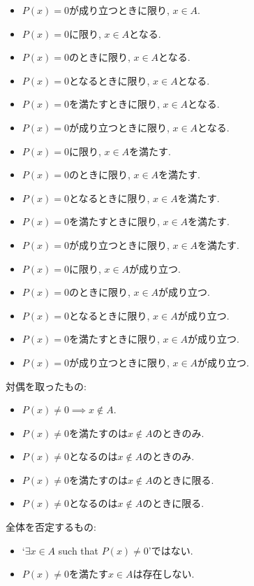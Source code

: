 \documentclass[a4paper,12pt,draft]{amsart}
\begin{document}
\begin{itemize}
\item $P(x)=0$が成り立つときに限り, $x\in A$.
\item $P(x)=0$に限り, $x\in A$となる.
\item $P(x)=0$のときに限り, $x\in A$となる.
\item $P(x)=0$となるときに限り, $x\in A$となる.
\item $P(x)=0$を満たすときに限り, $x\in A$となる.
\item $P(x)=0$が成り立つときに限り, $x\in A$となる.
\item $P(x)=0$に限り, $x\in A$を満たす.
\item $P(x)=0$のときに限り, $x\in A$を満たす.
\item $P(x)=0$となるときに限り, $x\in A$を満たす.
\item $P(x)=0$を満たすときに限り, $x\in A$を満たす.
\item $P(x)=0$が成り立つときに限り, $x\in A$を満たす.
\item $P(x)=0$に限り, $x\in A$が成り立つ.
\item $P(x)=0$のときに限り, $x\in A$が成り立つ.
\item $P(x)=0$となるときに限り, $x\in A$が成り立つ.
\item $P(x)=0$を満たすときに限り, $x\in A$が成り立つ.
\item $P(x)=0$が成り立つときに限り, $x\in A$が成り立つ.
\end{itemize}
対偶を取ったもの:
\begin{itemize}
\item $P(x)\neq 0\implies x\not\in A$.
\item $P(x)\neq 0$を満たすのは$x\not\in A$のときのみ.
\item $P(x)\neq 0$となるのは$x\not\in A$のときのみ.
\item $P(x)\neq 0$を満たすのは$x\not\in A$のときに限る.
\item $P(x)\neq 0$となるのは$x\not\in A$のときに限る.
\end{itemize}
全体を否定するもの:
\begin{itemize}
\item `$\exists x\in A$ such that $P(x)\neq 0$'ではない.
\item $P(x)\neq 0$を満たす$x\in A$は存在しない.
\end{itemize}
\end{document}

